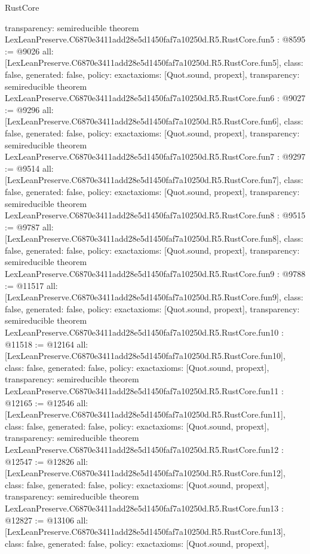 \begin{lexlean}{RustCore}
\begin{coremodule}
{  transparency: semireducible
}
theorem LexLeanPreserve.C6870e3411add28e5d1450faf7a10250d.R5.RustCore.fun5 : @8595 := @9026 {
  all: [LexLeanPreserve.C6870e3411add28e5d1450faf7a10250d.R5.RustCore.fun5],
  class: false,
  generated: false,
  policy: exact{axioms: [Quot.sound, propext]},
  transparency: semireducible
}
theorem LexLeanPreserve.C6870e3411add28e5d1450faf7a10250d.R5.RustCore.fun6 : @9027 := @9296 {
  all: [LexLeanPreserve.C6870e3411add28e5d1450faf7a10250d.R5.RustCore.fun6],
  class: false,
  generated: false,
  policy: exact{axioms: [Quot.sound, propext]},
  transparency: semireducible
}
theorem LexLeanPreserve.C6870e3411add28e5d1450faf7a10250d.R5.RustCore.fun7 : @9297 := @9514 {
  all: [LexLeanPreserve.C6870e3411add28e5d1450faf7a10250d.R5.RustCore.fun7],
  class: false,
  generated: false,
  policy: exact{axioms: [Quot.sound, propext]},
  transparency: semireducible
}
theorem LexLeanPreserve.C6870e3411add28e5d1450faf7a10250d.R5.RustCore.fun8 : @9515 := @9787 {
  all: [LexLeanPreserve.C6870e3411add28e5d1450faf7a10250d.R5.RustCore.fun8],
  class: false,
  generated: false,
  policy: exact{axioms: [Quot.sound, propext]},
  transparency: semireducible
}
theorem LexLeanPreserve.C6870e3411add28e5d1450faf7a10250d.R5.RustCore.fun9 : @9788 := @11517 {
  all: [LexLeanPreserve.C6870e3411add28e5d1450faf7a10250d.R5.RustCore.fun9],
  class: false,
  generated: false,
  policy: exact{axioms: [Quot.sound, propext]},
  transparency: semireducible
}
theorem LexLeanPreserve.C6870e3411add28e5d1450faf7a10250d.R5.RustCore.fun10 : @11518 := @12164 {
  all: [LexLeanPreserve.C6870e3411add28e5d1450faf7a10250d.R5.RustCore.fun10],
  class: false,
  generated: false,
  policy: exact{axioms: [Quot.sound, propext]},
  transparency: semireducible
}
theorem LexLeanPreserve.C6870e3411add28e5d1450faf7a10250d.R5.RustCore.fun11 : @12165 := @12546 {
  all: [LexLeanPreserve.C6870e3411add28e5d1450faf7a10250d.R5.RustCore.fun11],
  class: false,
  generated: false,
  policy: exact{axioms: [Quot.sound, propext]},
  transparency: semireducible
}
theorem LexLeanPreserve.C6870e3411add28e5d1450faf7a10250d.R5.RustCore.fun12 : @12547 := @12826 {
  all: [LexLeanPreserve.C6870e3411add28e5d1450faf7a10250d.R5.RustCore.fun12],
  class: false,
  generated: false,
  policy: exact{axioms: [Quot.sound, propext]},
  transparency: semireducible
}
theorem LexLeanPreserve.C6870e3411add28e5d1450faf7a10250d.R5.RustCore.fun13 : @12827 := @13106 {
  all: [LexLeanPreserve.C6870e3411add28e5d1450faf7a10250d.R5.RustCore.fun13],
  class: false,
  generated: false,
  policy: exact{axioms: [Quot.sound, propext]},
}
\end{coremodule}
\end{lexlean}
